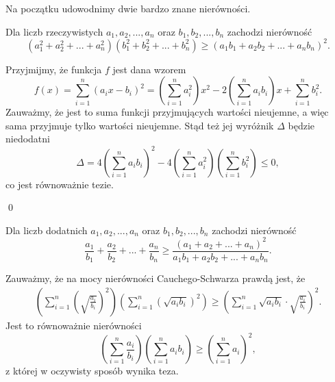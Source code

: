 

\noindent
Na początku udowodnimy dwie bardzo znane nierówności. 

\vspace{10px}


\noindent
Dla liczb rzeczywistych $a_1, a_2, ..., a_n$ oraz $b_1, b_2, ..., b_n$ zachodzi nierówność
\[
	\left(a_1^2 + a_2^2 + ... + a_n^2\right)\left(b_1^2 + b_2^2 + ... + b_n^2\right) \geqslant \left(a_1b_1 + a_2b_2 + ... + a_nb_n\right)^2.
\]


\noindent
Przyjmijmy, że funkcja $f$ jest dana wzorem
\[
	f(x) = \sum^{n}_{i=1} (a_ix - b_i)^2 = \left(\sum^{n}_{i=1} a_i^2\right) x^2 - 2\left(\sum^{n}_{i=1} a_ib_i\right) x + \sum^{n}_{i=1} b_i^2.
\]
Zauważmy, że jest to suma funkcji przyjmujących wartości nieujemne, a więc sama przyjmuje tylko wartości nieujemne. Stąd też jej wyróżnik $\Delta$ będzie niedodatni
\[
	\Delta = 4\left(\sum^{n}_{i=1} a_ib_i\right)^2 - 4  \left(\sum^{n}_{i=1} a_i^2\right)  \left(\sum^{n}_{i=1} b_i^2\right) \leqslant 0,
\]
co jest równoważnie tezie.

\qed

\vspace{10px}



\noindent
Dla liczb dodatnich $a_1, a_2, ..., a_n$ oraz $b_1, b_2, ..., b_n$ zachodzi nierówność
\[
	\frac{a_1}{b_1} + \frac{a_2}{b_2} + ... + \frac{a_n}{b_n} \geqslant \frac{\left(a_1 + a_2 + ... + a_n\right)^2}{a_1b_1 + a_2b_2 + ... + a_nb_n}.
\]


\noindent
Zauważmy, że na mocy nierówności Cauchego-Schwarza prawdą jest, że
\begin{gather*}
	\left(\sum^{n}_{i = 1} \left(\sqrt{\frac{a_i}{b_i}}\right)^2 \right) \left(\sum^{n}_{i = 1} \left(\sqrt{a_ib_i}\right)^2 \right) \geqslant \left(\sum^{n}_{i = 1} \sqrt{a_ib_i} \cdot \sqrt{\frac{a_i}{b_i}} \right)^2.
\end{gather*}
Jest to równoważnie nierówności
\[
	\left(\sum^{n}_{i = 1} \frac{a_i}{b_i} \right) \left(\sum^{n}_{i = 1} a_ib_i \right) \geqslant \left(\sum^{n}_{i = 1} a_i \right)^2,
\]
z której w oczywisty sposób wynika teza.

